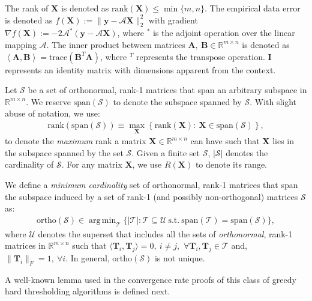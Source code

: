 \documentclass[twocolumn]{svjour3}
\newcommand{\vectornorm}[1]{\|#1\|}
\newcommand{\vectornormbig}[1]{\big\|#1\big\|}
\newcommand{\obs}{\boldsymbol{y}}
\newcommand{\sensing}{\boldsymbol{\mathcal{A}}}
\newcommand{\signal}{\boldsymbol{X}}
\newcommand{\dimension}{m \times n}
\DeclareMathOperator*{\argmin}{arg\,min}
\begin{document}
The rank of $ \signal $ is denoted as $ \text{rank}(\signal) \leq \min\lbrace m, n \rbrace $. The empirical data error is denoted as $f(\signal) := \vectornorm{\obs - \sensing \signal}_2^2 $ with gradient $ \nabla f(\signal) := -2 \sensing^\ast(\obs - \sensing \signal)$,  where $^\ast $ is the adjoint operation over the linear mapping $ \sensing $. The inner product between matrices $ \boldsymbol{A},~\boldsymbol{B} \in \mathbb{R}^{\dimension} $ is denoted as $ \left\langle \boldsymbol{A}, \boldsymbol{B} \right\rangle = \text{trace}(\boldsymbol{B}^T\boldsymbol{A})$, where $ ^T $ represents the transpose operation. $ \mathbf{I} $ represents an identity matrix with dimensions apparent from the context. 

Let $\mathcal{S} $ be a set of orthonormal, rank-1 matrices that span an arbitrary subspace in $\mathbb{R}^{\dimension}$. We reserve $ \text{span}(\mathcal{S}) $ to denote the subspace spanned by $\mathcal{S}$. With slight abuse of notation, we use:
\begin{align}
\text{rank}(\text{span}(\mathcal{S})) \equiv \max_{\boldsymbol{X}} \left \{ \text{rank}(\boldsymbol{X}):~\boldsymbol{X} \in \text{span}(\mathcal{S}) \right \},
\end{align} to denote the {\it maximum} rank a matrix $\boldsymbol{X} \in \mathbb{R}^{\dimension}$ can have such that $\boldsymbol{X}$ lies in the subspace spanned by the set $ \mathcal{S} $. Given a finite set $ \mathcal{S} $, $ |\mathcal{S}| $ denotes the cardinality of $ \mathcal{S} $. For any matrix $ \boldsymbol{X} $, we use $ R(\boldsymbol{X}) $ to denote its range.

We define a {\it minimum cardinality} set of orthonormal, rank-1 matrices that span the subspace induced by a set of rank-1 (and possibly non-orthogonal) matrices $\mathcal{S}$ as:
\begin{align}
\text{ortho}(\mathcal{S}) \in \argmin_{\mathcal{T}} \lbrace |\mathcal{T}|: \mathcal{T} \subseteq \mathcal{U}~\text{s.t.}~ \text{span}(\mathcal{T}) = \text{span}(\mathcal{S}) \rbrace, \nonumber
\end{align} where $ \mathcal{U} $ denotes the superset that includes all the sets of {\it orthonormal}, rank-1 matrices in $\mathbb{R}^{\dimension}$ such that $ \langle \boldsymbol{T}_i, \boldsymbol{T}_j \rangle = 0,~i \neq j, $ $\forall \boldsymbol{T}_i,\boldsymbol{T}_j \in \mathcal{T} $ and, $\vectornormbig{\boldsymbol{T}_i}_F = 1,~\forall i$. In general, $ \text{ortho}(\mathcal{S}) $ is not unique.

A well-known lemma used in the convergence rate proofs of this class of greedy hard thresholding algorithms is defined next.
\end{document}
